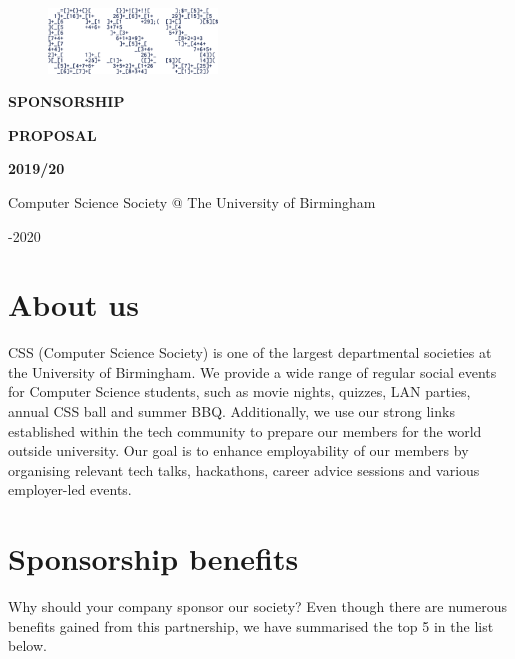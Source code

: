 \documentclass{article}
\begin{document}
\begin{figure}
  \includegraphics[width=0.4\textwidth]{CSS_Logo}
\end{figure}

\vspace*{0.1cm}

\fontsize{56}{50}\selectfont

\noindent\textbf{SPONSORSHIP}

\par

\noindent\textbf{PROPOSAL}

\par

\noindent\textbf{2019/20}

\fontsize{13}{18}\selectfont

\vspace{0.5cm}

\noindent Computer Science Society @ The University of Birmingham 

-2020

\vspace{1cm}

\section*{About us}

CSS (Computer Science Society) is one of the largest departmental societies at the University of Birmingham.
We provide a wide range of regular social events  for Computer Science students, such as movie nights, quizzes, LAN parties, annual CSS ball and summer BBQ.
Additionally, we use our strong links established within the tech community to prepare our members for the world outside university.
Our goal is to enhance employability of our members by organising relevant tech talks, hackathons, career advice sessions and various employer-led events.

\newpage

\section*{Sponsorship benefits}

Why should your company sponsor our society?
Even though there are numerous benefits gained from this partnership, we have summarised the top 5 in the list below.
\end{document}

